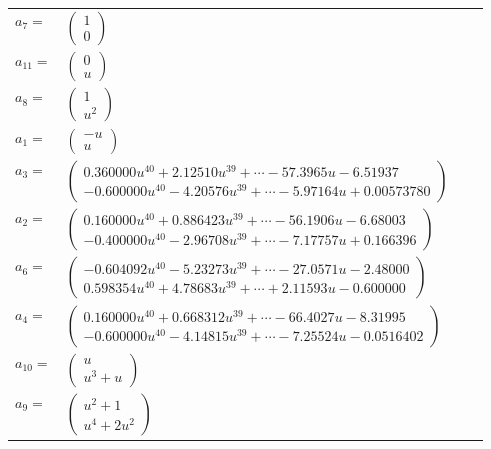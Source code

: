 \documentclass[1p]{elsarticle_modified}
\theoremstyle{definition}
\begin{document}
\begin{tabular}{m{7pt} m{180pt} m{7pt} m{180pt} }
\flushright $a_{7}=$&$\begin{pmatrix}1\\0\end{pmatrix}$ \\
\flushright $a_{11}=$&$\begin{pmatrix}0\\u\end{pmatrix}$ \\
\flushright $a_{8}=$&$\begin{pmatrix}1\\u^2\end{pmatrix}$ \\
\flushright $a_{1}=$&$\begin{pmatrix}- u\\u\end{pmatrix}$ \\
\flushright $a_{3}=$&$\begin{pmatrix}0.360000 u^{40}+2.12510 u^{39}+\cdots-57.3965 u-6.51937\\-0.600000 u^{40}-4.20576 u^{39}+\cdots-5.97164 u+0.00573780\end{pmatrix}$ \\
\flushright $a_{2}=$&$\begin{pmatrix}0.160000 u^{40}+0.886423 u^{39}+\cdots-56.1906 u-6.68003\\-0.400000 u^{40}-2.96708 u^{39}+\cdots-7.17757 u+0.166396\end{pmatrix}$ \\
\flushright $a_{6}=$&$\begin{pmatrix}-0.604092 u^{40}-5.23273 u^{39}+\cdots-27.0571 u-2.48000\\0.598354 u^{40}+4.78683 u^{39}+\cdots+2.11593 u-0.600000\end{pmatrix}$ \\
\flushright $a_{4}=$&$\begin{pmatrix}0.160000 u^{40}+0.668312 u^{39}+\cdots-66.4027 u-8.31995\\-0.600000 u^{40}-4.14815 u^{39}+\cdots-7.25524 u-0.0516402\end{pmatrix}$ \\
\flushright $a_{10}=$&$\begin{pmatrix}u\\u^3+u\end{pmatrix}$ \\
\flushright $a_{9}=$&$\begin{pmatrix}u^2+1\\u^4+2 u^2\end{pmatrix}$ \\

\end{tabular}
\end{document}
